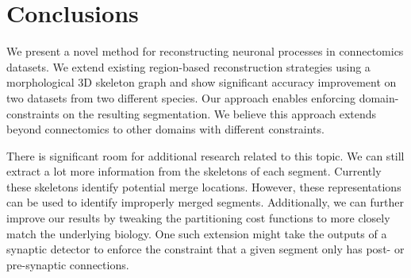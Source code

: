 \section{Conclusions}

We present a novel method for reconstructing neuronal processes in connectomics datasets. 
We extend existing region-based reconstruction strategies using a morphological 3D skeleton graph and show significant accuracy improvement on two datasets from two different species. 
Our approach enables enforcing domain-constraints on the resulting segmentation. 
We believe this approach extends beyond connectomics to other domains with different constraints.

There is significant room for additional research related to this topic.
We can still extract a lot more information from the skeletons of each segment.
Currently these skeletons identify potential merge locations.
However, these representations can be used to identify improperly merged segments.
Additionally, we can further improve our results by tweaking the partitioning cost functions to more closely match the underlying biology.
One such extension might take the outputs of a synaptic detector to enforce the constraint that a given segment only has post- or pre-synaptic connections. 
